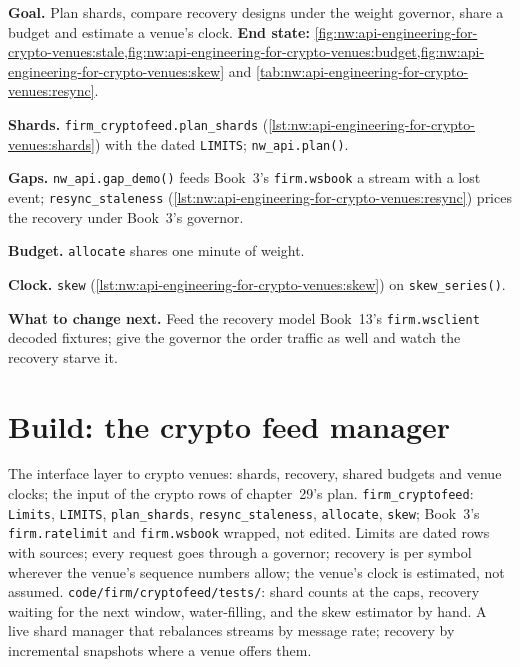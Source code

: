 \begin{tutorial}
\textbf{Goal.} Plan shards, compare recovery designs under the weight governor, share a budget and estimate a venue's clock.
\textbf{End state:} \cref{fig:nw:api-engineering-for-crypto-venues:stale,fig:nw:api-engineering-for-crypto-venues:budget,fig:nw:api-engineering-for-crypto-venues:skew}
and \cref{tab:nw:api-engineering-for-crypto-venues:resync}.
\begin{tutsteps}
\item \textbf{Shards.} \texttt{firm\_cryptofeed.plan\_shards} (\cref{lst:nw:api-engineering-for-crypto-venues:shards}) with the dated
  \texttt{LIMITS}; \texttt{nw\_api.plan()}.
\item \textbf{Gaps.} \texttt{nw\_api.gap\_demo()} feeds Book~3's \texttt{firm.wsbook} a stream with a lost event; \texttt{resync\_staleness}
  (\cref{lst:nw:api-engineering-for-crypto-venues:resync}) prices the recovery under Book~3's governor.
\item \textbf{Budget.} \texttt{allocate} shares one minute of weight.
\item \textbf{Clock.} \texttt{skew} (\cref{lst:nw:api-engineering-for-crypto-venues:skew}) on \texttt{skew\_series()}.
\end{tutsteps}
\textbf{What to change next.} Feed the recovery model Book~13's \texttt{firm.wsclient} decoded fixtures; give the governor the order traffic as
well and watch the recovery starve it.
\end{tutorial}

\section{Build: the crypto feed manager}\label{bld:nw:api-engineering-for-crypto-venues:cryptofeed}

\begin{build}
 The interface layer to crypto venues: shards, recovery, shared budgets and venue clocks; the input of the crypto rows of chapter~29's
plan.
 \texttt{firm\_cryptofeed}: \texttt{Limits}, \texttt{LIMITS}, \texttt{plan\_shards}, \texttt{resync\_staleness}, \texttt{allocate},
\texttt{skew}; Book~3's \texttt{firm.ratelimit} and \texttt{firm.wsbook} wrapped, not edited.
 Limits are dated rows with sources; every request goes through a governor; recovery is per symbol wherever the venue's sequence numbers
allow; the venue's clock is estimated, not assumed.
 \texttt{code/firm/cryptofeed/tests/}: shard counts at the caps, recovery waiting for the next window, water-filling, and the
skew estimator by hand.
 A live shard manager that rebalances streams by message rate; recovery by incremental snapshots where a venue offers them.
\end{build}

